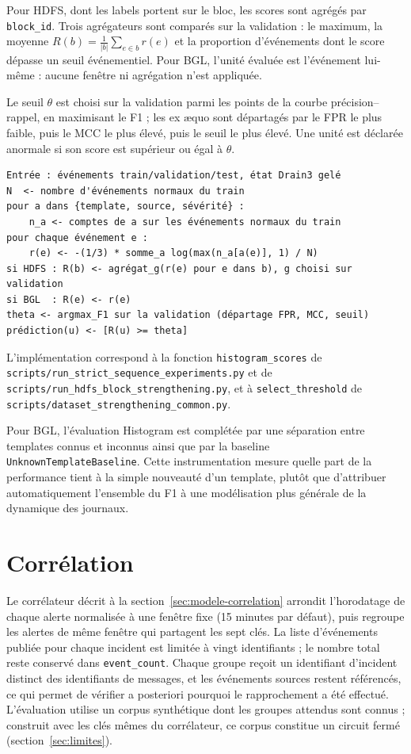 Pour HDFS, dont les labels portent sur le bloc, les scores sont agrégés par \texttt{block\_id}. Trois agrégateurs sont comparés sur la validation : le maximum, la moyenne $R(b) = \frac{1}{|b|}\sum_{e \in b} r(e)$ et la proportion d'événements dont le score dépasse un seuil événementiel. Pour BGL, l'unité évaluée est l'événement lui-même : aucune fenêtre ni agrégation n'est appliquée.

Le seuil $\theta$ est choisi sur la validation parmi les points de la courbe précision--rappel, en maximisant le F1 ; les ex æquo sont départagés par le FPR le plus faible, puis le MCC le plus élevé, puis le seuil le plus élevé. Une unité est déclarée anormale si son score est supérieur ou égal à $\theta$.

\begin{verbatim}
Entrée : événements train/validation/test, état Drain3 gelé
N  <- nombre d'événements normaux du train
pour a dans {template, source, sévérité} :
    n_a <- comptes de a sur les événements normaux du train
pour chaque événement e :
    r(e) <- -(1/3) * somme_a log(max(n_a[a(e)], 1) / N)
si HDFS : R(b) <- agrégat_g(r(e) pour e dans b), g choisi sur validation
si BGL  : R(e) <- r(e)
theta <- argmax_F1 sur la validation (départage FPR, MCC, seuil)
prédiction(u) <- [R(u) >= theta]
\end{verbatim}

L'implémentation correspond à la fonction \texttt{histogram\_scores} de \texttt{scripts/run\_strict\_sequence\_experiments.py} et de \texttt{scripts/run\_hdfs\_block\_strengthening.py}, et à \texttt{select\_threshold} de \texttt{scripts/dataset\_strengthening\_common.py}.

Pour BGL, l'évaluation Histogram est complétée par une séparation entre templates connus et inconnus ainsi que par la baseline \texttt{UnknownTemplateBaseline}. Cette instrumentation mesure quelle part de la performance tient à la simple nouveauté d'un template, plutôt que d'attribuer automatiquement l'ensemble du F1 à une modélisation plus générale de la dynamique des journaux.


\section{Corrélation}

Le corrélateur décrit à la section~\ref{sec:modele-correlation} arrondit l'horodatage de chaque alerte normalisée à une fenêtre fixe (15 minutes par défaut), puis regroupe les alertes de même fenêtre qui partagent les sept clés. La liste d'événements publiée pour chaque incident est limitée à vingt identifiants ; le nombre total reste conservé dans \texttt{event\_count}. Chaque groupe reçoit un identifiant d'incident distinct des identifiants de messages, et les événements sources restent référencés, ce qui permet de vérifier a posteriori pourquoi le rapprochement a été effectué. L'évaluation utilise un corpus synthétique dont les groupes attendus sont connus ; construit avec les clés mêmes du corrélateur, ce corpus constitue un circuit fermé (section~\ref{sec:limites}).


